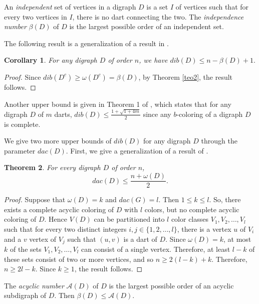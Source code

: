 \documentclass[12pt]{article}
\newtheorem{theorem}{Theorem}
\newtheorem{corollary}[theorem]{Corollary}
\begin{document}
An \textit{independent} set of vertices in a digraph $D$ is a set $I$ of vertices such that for every two vertices in $I$, there is no dart connecting the two. The \textit{independence number} $\beta(D)$ of $D$ is the largest possible order of an independent set.

The following result is a generalization of a result in \cite{MR1927071}.

\begin{corollary}\label{cor3}
For any digraph $D$ of order $n$, we have $dib(D)\leq n-\beta(D)+1.$
\end{corollary}
\begin{proof}
Since $dib(D^c)\geq \omega(D^c) = \beta(D)$, by Theorem \ref{teo2}, the result follows.
\end{proof}

Another upper bound is given in Theorem 1 of \cite{MR3875016}, which states that for any digraph $D$ of $m$ darts,  $dib(D)\leq \frac{1+\sqrt{1+4m}}{2}$ since any $b$-coloring of a digraph $D$ is complete.

We give two more upper bounds of $dib(D)$ for any digraph $D$ through the parameter $dac(D)$. First, we give a generalization of a result of \cite{MR1108075}.

\begin{theorem}\label{teo4}
For every digraph $D$ of order $n$, \[dac(D)\leq \frac{n+\omega(D)}{2}.\]
\end{theorem}
\begin{proof}
Suppose that $\omega(D)=k$ and $dac(G)=l$. Then $1\leq k \leq l$. So, there exists a complete acyclic coloring of $D$ with $l$ colors, but no complete acyclic coloring of $D$. Hence $V(D)$ can be partitioned into $l$ color classes $V_1,V_2,\dots,V_l$ such that for every two distinct integers $i,j\in\{1,2,\dots,l\}$, there is a vertex $u$ of $V_i$ and a $v$ vertex of $V_j$ such that $(u,v)$ is a dart of $D$. Since $\omega(D)=k$, at most $k$ of the sets $V_1,V_2,\dots,V_l$ can consist of a single vertex. Therefore, at least $l-k$ of these sets consist of two or more vertices, and so $n \geq 2(l-k) + k$. Therefore, $n \geq 2l-k$. Since $k\geq 1$, the result follows.
\end{proof}

The \textit{acyclic number} $\mathcal{A}(D)$ of $D$ is the largest possible order of an acyclic subdigraph of $D$. Then $\beta(D)\leq \mathcal{A}(D)$.
\end{document}

